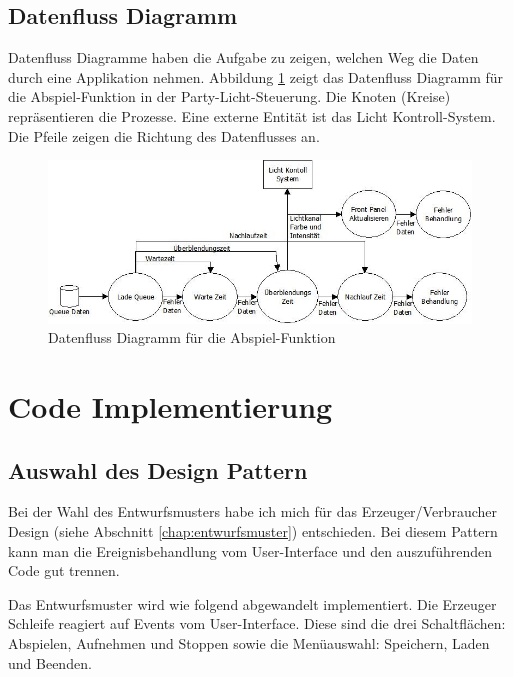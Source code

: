 \subsection{Datenfluss Diagramm}
Datenfluss Diagramme haben die Aufgabe zu zeigen, welchen Weg die Daten durch eine Applikation nehmen. Abbildung \ref{fig:plan02} zeigt das Datenfluss Diagramm für die Abspiel-Funktion in der Party-Licht-Steuerung. Die Knoten (Kreise) repräsentieren die Prozesse. Eine externe Entität ist das Licht Kontroll-System. Die Pfeile zeigen die Richtung des Datenflusses an.
	\begin{figure}[!ht]
	\centering
		\includegraphics[width=\textwidth]{Pics/play-dataflow.jpeg}
	\caption{Datenfluss Diagramm für die Abspiel-Funktion}
	\label{fig:plan02}
	\end{figure}	

	

\section{Code Implementierung}
\label{chap:impl}
		\subsection{Auswahl des Design Pattern} %
		\label{chap:designpattern}
		Bei der Wahl des Entwurfsmusters habe ich mich für das Erzeuger/Verbraucher Design  (siehe Abschnitt \ref{chap:entwurfsmuster}) entschieden. Bei diesem Pattern kann man die Ereignisbehandlung vom User-Interface und den auszuführenden Code gut trennen. 

Das Entwurfsmuster wird wie folgend abgewandelt implementiert.  Die Erzeuger Schleife reagiert auf Events vom User-Interface. Diese sind die drei Schaltflächen: Abspielen, Aufnehmen und Stoppen sowie die Menüauswahl: Speichern, Laden und Beenden.

